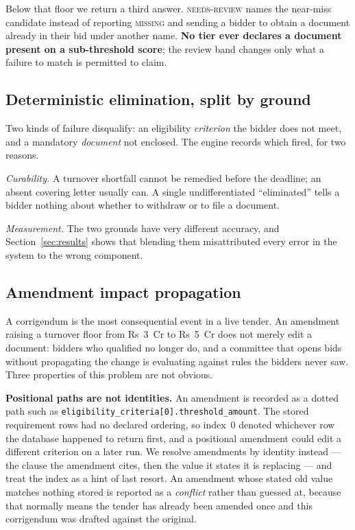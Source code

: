 \documentclass[conference]{IEEEtran}
\begin{document}
Below that floor we return a third answer. \textsc{needs-review} names the
near-miss candidate instead of reporting \textsc{missing} and sending a bidder
to obtain a document already in their bid under another name. \textbf{No tier
ever declares a document present on a sub-threshold score}; the review band
changes only what a failure to match is permitted to claim.

\subsection{Deterministic elimination, split by ground}

Two kinds of failure disqualify: an eligibility \emph{criterion} the bidder does
not meet, and a mandatory \emph{document} not enclosed. The engine records which
fired, for two reasons.

\textit{Curability.} A turnover shortfall cannot be remedied before the
deadline; an absent covering letter usually can. A single undifferentiated
``eliminated'' tells a bidder nothing about whether to withdraw or to file a
document.

\textit{Measurement.} The two grounds have very different accuracy, and
Section~\ref{sec:results} shows that blending them misattributed every error in
the system to the wrong component.

\subsection{Amendment impact propagation}
\label{sec:corrigendum}

A corrigendum is the most consequential event in a live tender. An amendment
raising a turnover floor from Rs~3~Cr to Rs~5~Cr does not merely edit a
document: bidders who qualified no longer do, and a committee that opens bids
without propagating the change is evaluating against rules the bidders never
saw. Three properties of this problem are not obvious.

\textbf{Positional paths are not identities.} An amendment is recorded as a
dotted path such as \texttt{eligibility\_criteria[0].threshold\_amount}. The
stored requirement rows had no declared ordering, so index~0 denoted whichever
row the database happened to return first, and a positional amendment could
edit a different criterion on a later run. We resolve amendments by identity
instead --- the clause the amendment cites, then the value it states it is
replacing --- and treat the index as a hint of last resort. An amendment whose
stated old value matches nothing stored is reported as a \emph{conflict} rather
than guessed at, because that normally means the tender has already been
amended once and this corrigendum was drafted against the original.
\end{document}
